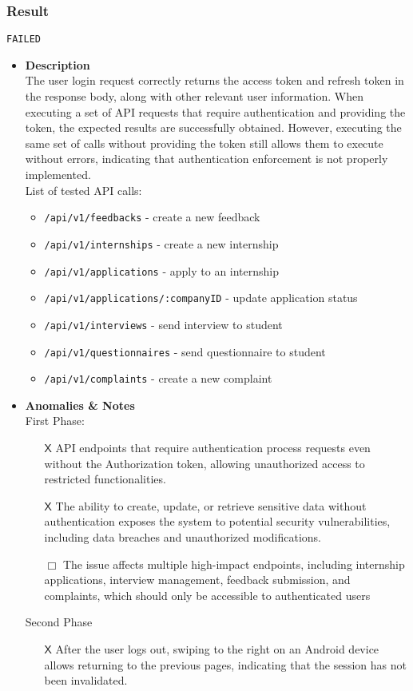 \subsubsection{Result}
\verb|FAILED|
\begin{itemize}
    \item \textbf{\color{titleColor} Description}\\
    The user login request correctly returns the access token and refresh token in the response body, along with other relevant user information. When executing a set of API requests that require authentication and providing the token, the expected results are successfully obtained. However, executing the same set of calls without providing the token still allows them to execute without errors, indicating that authentication enforcement is not properly implemented. \\
    List of tested API calls:
    \begin{itemize}[label = \textbf{\color{titleColor} -}]
        \item \verb|/api/v1/feedbacks| - create a new feedback
        \item \verb|/api/v1/internships| - create a new internship
        \item \verb|/api/v1/applications| - apply to an internship
        \item \verb|/api/v1/applications/:companyID| - update application status
        \item \verb|/api/v1/interviews| - send interview to student
        \item \verb|/api/v1/questionnaires| - send questionnaire to student
        \item \verb|/api/v1/complaints| - create a new complaint
    \end{itemize}
    \item \textbf{\color{titleColor} Anomalies \& Notes}\\
    First Phase:
    \begin{itemize}
            \item [{\color{titleColor}\(\mathsf{X}\)}] API endpoints that require authentication process requests even without the Authorization token, allowing unauthorized access to restricted functionalities.
            \item [{\color{titleColor}\(\mathsf{X}\)}]  The ability to create, update, or retrieve sensitive data without authentication exposes the system to potential security vulnerabilities, including data breaches and unauthorized modifications.
            \item [{\color{titleColor}\(\Box \)}] The issue affects multiple high-impact endpoints, including internship applications, interview management, feedback submission, and complaints, which should only be accessible to authenticated users
        \end{itemize} 
        Second Phase
        \begin{itemize}
            \item [{\color{titleColor}\(\mathsf{X}\)}] After the user logs out, swiping to the right on an Android device allows returning to the previous pages, indicating that the session has not been invalidated.
            

\end{itemize}
\end{itemize}
